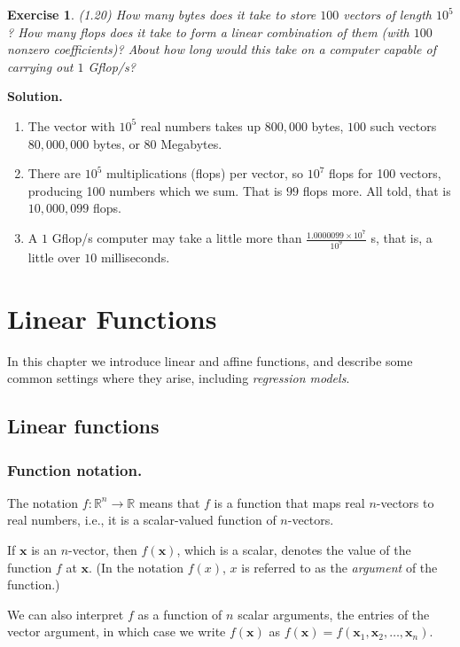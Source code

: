 \documentclass[11pt]{book}
\theoremstyle{definition}
\theoremstyle{plain}
\newtheorem{exercise}{Exercise}[chapter]
\theoremstyle{problemstyle}
\theoremstyle{remark}
\theoremstyle{definition}
\begin{document}
\begin{exercise}
    (1.20) How many bytes does it take to store $100$ vectors of length $10^5$? How many flops does it take to form a linear combination of them (with $100$ nonzero coefficients)? About how long would this take on a computer capable of carrying out $1$ Gflop/s?
\end{exercise}
\textbf{Solution.}
\begin{enumerate}[label=(\alph*)]
    \item The vector with $10^5$ real numbers takes up $800,000$ bytes, $100$ such vectors $80,000,000$ bytes, or $80$ Megabytes.
    \item There are $10^5$ multiplications (flops) per vector, so $10^7$ flops for 100 vectors, producing 100 numbers which we sum. That is $99$ flops more. All told, that is $10,000,099$ flops.
    \item A $1$ Gflop/s computer may take a little more than $\frac{1.0000099\times 10^7}{10^9}$ s, that is, a little over $10$ milliseconds.
\end{enumerate}

\chapter{Linear Functions}

In this chapter  we introduce linear and affine functions, and describe some common settings where they arise, including \emph{regression models}.

\section{Linear functions}

\subsection*{Function notation.}
The notation $f:\mathbb{R}^n\rightarrow\mathbb{R}$ means that $f$ is a function that maps real $n$-vectors to real numbers, i.e., it is a scalar-valued function of $n$-vectors.

If $\boldsymbol{x}$ is an $n$-vector, then $f(\boldsymbol{x})$, which is a scalar, denotes the value of the function $f$ at $\boldsymbol{x}$. (In the notation $f(x)$, $x$ is referred to as the \emph{argument} of the function.)

We can also interpret $f$ as a function of $n$ scalar arguments, the entries of the vector argument, in which case we write $f(\boldsymbol{x})$ as $f(\boldsymbol{x}) = f(\boldsymbol{x}_1, \boldsymbol{x}_2,\dots,\boldsymbol{x}_n)$.
\end{document}
